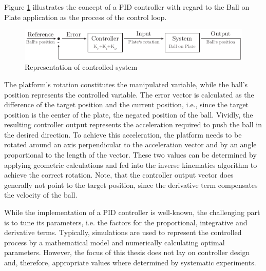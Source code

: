 Figure \ref{fig:pid_rep} illustrates the concept of a \ac{PID} controller with
regard to the Ball on Plate application as the process of the control loop.
\begin{figure}
	\centering
	\centering
	\includegraphics{../figures/pid_rep}
	\caption{Representation of controlled system}
	\label{fig:pid_rep}
\end{figure}
The platform's rotation constitutes the manipulated variable, while the ball's
position represents the controlled variable. The error vector is calculated as
the difference of the target position and the current position, i.e., since
the target position is the center of the plate, the negated position of the
ball. Vividly, the resulting controller output represents the acceleration
required to push the ball in the desired direction. To achieve this
acceleration, the platform needs to be rotated around an axis perpendicular to
the acceleration vector and by an angle proportional to the length of the
vector. These two values can be determined by applying geometric calculations
and fed into the inverse kinematics algorithm to achieve the correct rotation.
Note, that the controller output vector does generally not point to the target
position, since the derivative term compensates the velocity of the ball.

While the implementation of a \ac{PID} controller is well-known, the
challenging part is to tune its parameters, i.e. the factors for the
proportional, integrative and derivative terms. Typically, simulations are
used to represent the controlled process by a mathematical model and
numerically calculating optimal parameters. However, the focus of this thesis
does not lay on controller design and, therefore, appropriate values where
determined by systematic experiments.

